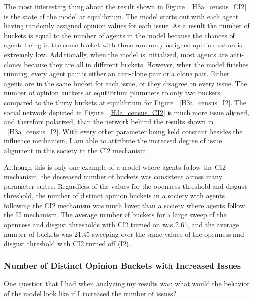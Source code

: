 The most interesting thing about the result shown in Figure ~\ref{H3a_census_CI2} is the state of the model at equilibrium. The model starts out with each agent having randomly assigned opinion values for each issue. As a result the number of buckets is equal to the number of agents in the model because the chances of agents being in the same bucket with three randomly assigned opinion values is extremely low. Additionally, when the model is initialized, most agents are anti-clones because they are all in different buckets. However, when the model finishes running, every agent pair is either an anti-clone pair or a clone pair. Either agents are in the same bucket for each issue, or they disagree on every issue. The number of opinion buckets at equilibrium plummets to only two buckets compared to the thirty buckets at equilibrium for Figure ~\ref{H3a_census_I2}. The social network depicted in Figure ~\ref{H3a_census_CI2} is much more issue aligned, and therefore polarized, than the network behind the results shown in ~\ref{H3a_census_I2}. With every other parameter being held constant besides the influence mechanism, I am able to attribute the increased degree of issue alignment in this society to the CI2 mechanism. 

Although this is only one example of a model where agents follow the CI2 mechanism, the decreased number of buckets was consistent across many parameter suites. Regardless of the values for the openness threshold and disgust threshold, the number of distinct opinion buckets in a society with agents following the CI2 mechanism was much lower than a society where agents follow the I2 mechanism. The average number of buckets for a large sweep of the openness and disgust thresholds with CI2 turned on was 2.61, and the average number of buckets was 21.45 sweeping over the same values of the openness and disgust threshold with CI2 turned off (I2).         

\subsubsection{Number of Distinct Opinion Buckets with Increased Issues}

One question that I had when analyzing my results was: what would the behavior of the model look like if I increased the number of issues? 